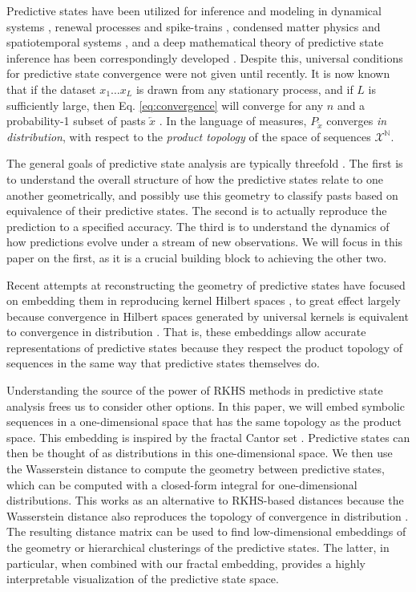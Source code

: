 \documentclass[sigconf, anonymous, review]{acmart}
\begin{document}
Predictive states have been utilized for inference and modeling in dynamical
systems \cite{Crut92c,Emen16a,Salo19a}, renewal processes and spike-trains
\cite{Marz14e,Marz15a}, condensed matter physics \cite{Varn12a,Varn14a} and
spatiotemporal systems \cite{Rupe19a,Rupe19b,Rupe20a}, and a deep mathematical
theory of predictive state inference has been correspondingly developed
\cite{Jaeg00a,Shal02a,Jame04a,Stil07b,Stre13a,Thon15a,Marz19a,Brod20a}. Despite
this, universal conditions for predictive state convergence were not given until
recently. It is now known that if the dataset $x_1 \dots x_L$ is drawn from any
stationary process, and if $L$ is sufficiently large, then Eq.
\eqref{eq:convergence} will converge for any $n$ and a probability-1 subset of
pasts $\overleftarrow{x}$ \cite{Loom21a}. In the language of measures,
$P_{\overleftarrow{x}}$ converges \emph{in distribution}, with respect to the
\emph{product topology} of the space of sequences $\mathcal{X}^\mathbb{N}$.

The general goals of predictive state analysis are typically threefold
\cite{Shal01a}. The first is to understand the overall structure of how the
predictive states relate to one another geometrically, and possibly use this
geometry to classify pasts based on equivalence of their predictive states. The
second is to actually reproduce the prediction to a specified accuracy. The
third is to understand the dynamics of how predictions evolve under a stream of
new observations. We will focus in this paper on the first, as it is a crucial
building block to achieving the other two.

Recent attempts at reconstructing the geometry of predictive states have focused
on embedding them in reproducing kernel Hilbert spaces
\cite{Song09a,Song10a,Boot13a,Brod20a,Loom21a}, to great effect largely because
convergence in Hilbert spaces generated by universal kernels is equivalent to
convergence in distribution \cite{Srip10a}. That is, these embeddings allow
accurate representations of predictive states because they respect the product
topology of sequences in the same way that predictive states themselves do. 

Understanding the source of the power of RKHS methods in predictive state
analysis frees us to consider other options. In this paper, we will embed
symbolic sequences in a one-dimensional space that has the same topology as the
product space. This embedding is inspired by the fractal Cantor set
\cite{Kurk03a}. Predictive states can then be thought of as distributions in
this one-dimensional space. We then use the Wasserstein distance to compute the
geometry between predictive states, which can be computed with a closed-form
integral for one-dimensional distributions. This works as an alternative to
RKHS-based distances because the Wasserstein distance also reproduces the
topology of convergence in distribution \cite{Pane19a}. The resulting distance
matrix can be used to find low-dimensional embeddings \cite{Borg05a} of the
geometry or hierarchical clusterings \cite{Mull11a} of the predictive states.
The latter, in particular, when combined with our fractal embedding, provides a
highly interpretable visualization of the predictive state space.
\end{document}
